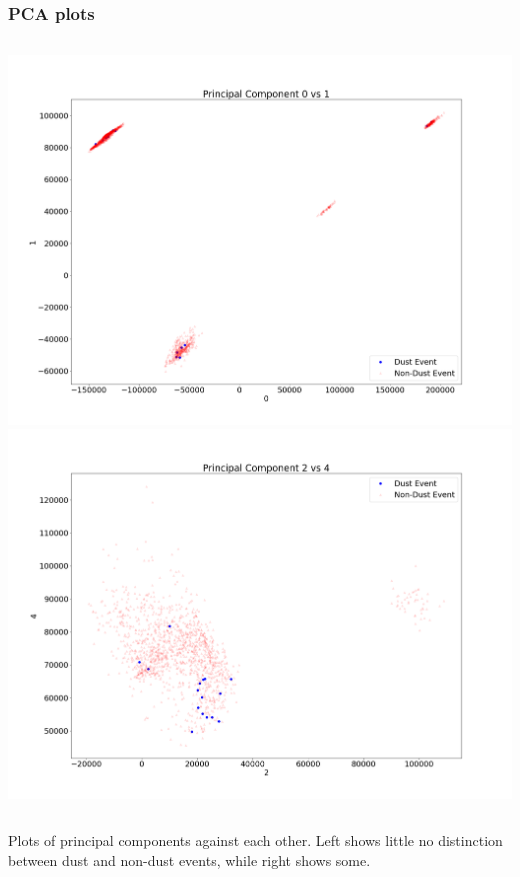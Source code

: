 \documentclass{beamer}
\begin{document}
\begin{frame}
	\frametitle{PCA plots}
	\begin{columns}
		\includegraphics[width=\textwidth]{images/0vs1.png}
		\includegraphics[width=\textwidth]{images/2vs4.png}
	\end{columns}

	Plots of principal components against each other. Left shows little no distinction between dust and non-dust events, while right shows some.
\end{frame}
\end{document}
